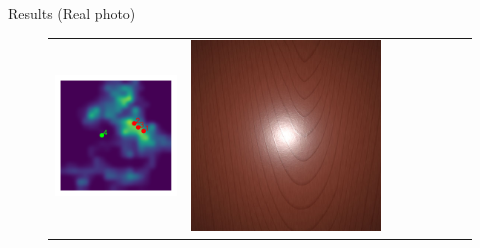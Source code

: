 \documentclass[final]{beamer}
\newlength{\twocolwid}
\newlength{\resultwidth}
\begin{document}
\begin{frame}[t]
\begin{columns}[t]
\begin{column}{\twocolwid}
\begin{block}{Results (Real photo)}
\begin{figure}[t]
\begin{tabular}{ccrclccc}
            		\includegraphics[width=\resultwidth]{real/wood/posterior.pdf} &
            		\includegraphics[width=\resultwidth]{real/wood/good1.jpg} &

\end{tabular}
\end{figure}
\end{block}
\end{column}
\end{columns}
\end{frame}
\end{document}
